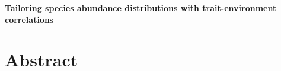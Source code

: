 \documentclass[12pt]{article}
\date{}
\begin{document}
\begin{flushleft}
{\Large
{\textbf{Tailoring species abundance distributions with
trait-environment correlations
}}
}
\end{flushleft}


\section*{Abstract}

\end{document}
